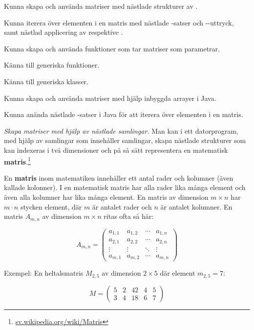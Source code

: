 

\Exercise{\ExeWeekNINE}\label{exe:W09}

\begin{Goals}
\item Kunna skapa och använda matriser med nästlade strukturer av .
\item Kunna iterera över elementen i en matris med nästlade -satser och --uttryck, samt nästlad applicering av  respektive .
\item Kunna skapa och använda funktioner som tar matriser som parametrar.
\item Känna till generiska funktioner.
\item Känna till generiska klasser.
\item Kunna skapa och använda matriser med hjälp inbyggda arrayer i Java.
\item Kunna anända nästlade -satser i Java för att iterera över elementen i en matris.
\end{Goals}

\begin{Preparations}
\item {} 
\end{Preparations}

\BasicTasks %

\Task \emph{Skapa matriser med hjälp av nästlade samlingar.} Man kan i ett datorprogram, med hjälp av samlingar som innehåller samlingar, skapa nästlade strukturer som kan indexeras i två dimensioner och på så sätt representera en matematisk \textbf{matris}.\footnote{\href{https://sv.wikipedia.org/wiki/Matris}{sv.wikipedia.org/wiki/Matris}} 
\begin{Background}
En \textbf{matris} inom matematiken innehåller ett antal rader och kolumner (även kallade kolonner). I en matematisk matris har alla rader lika många element och även alla kolumner har lika många element. En matris av dimension $m\times{}n$ har $m \cdot n$ stycken element, där $m$ är antalet rader och $n$ är antalet kolumner. En matris $A_{m,n}$ av dimension $m\times{}n$ ritas ofta så här:

\[
A_{m,n} = 
 \begin{pmatrix}
  a_{1,1} & a_{1,2} & \cdots & a_{1,n} \\
  a_{2,1} & a_{2,2} & \cdots & a_{2,n} \\
  \vdots  & \vdots  & \ddots & \vdots  \\
  a_{m,1} & a_{m,2} & \cdots & a_{m,n} 
 \end{pmatrix}
\]

\noindent Exempel: En heltalsmatris $M_{2,5}$ av dimension $2\times{}5$ där element $m_{2,5}=7$:

\[
M=
  \begin{pmatrix}
    5 & 2 & 42 & 4 & 5 \\
    3 & 4 & 18 & 6 & 7
  \end{pmatrix}
\]
\end{Background}

